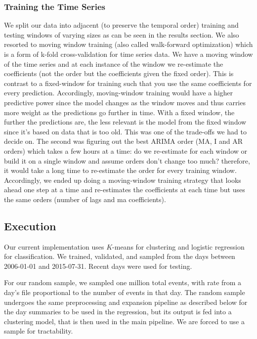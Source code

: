\subsubsection{Training the Time Series}
We split our data into adjacent (to preserve the temporal order) training and testing windows of varying sizes as can be seen in the results section. We also resorted to moving window training (also called walk-forward optimization) which is a form of k-fold cross-validation for time series data. We have a moving window of the time series and at each instance of the window we re-estimate the coefficients (not the order but the coefficients given the fixed order). This is contrast to a fixed-window for training such that you use the same coefficients for every prediction. Accordingly, moving-window training would have a higher predictive power since the model changes as the window moves and thus carries more weight as the predictions go further in time. With a fixed window, the further the predictions are, the less relevant is the model from the fixed window since it's based on data that is too old.
This was one of the trade-offs we had to decide on. The second was figuring out the best ARIMA order (MA, I and AR orders) which takes a few hours at a time: do we re-estimate for each window or build it on a single window and assume orders don't change too much? therefore, it would take a long time to re-estimate the order for every training window.
Accordingly, we ended up doing a moving-window training strategy that looks ahead one step at a time and re-estimates the coefficients at each time but uses the same orders (number of lags and ma coefficients).	

\subsection{Execution}

Our current implementation uses $K$-means for clustering and logistic regression for classification. We trained, validated, and sampled from the days between 2006-01-01 and 2015-07-31. Recent days were used for testing.

For our random sample, we sampled one million total events, with rate from a day's file proportional to the number of events in that day. The random sample undergoes the same preprocessing and expansion pipeline as described below for the day summaries to be used in the regression, but its output is fed into a clustering model, that is then used in the main pipeline. We are forced to use a sample for tractability.

